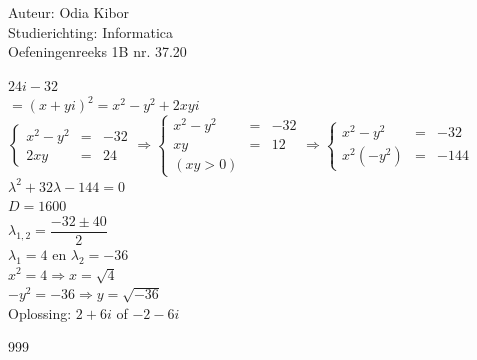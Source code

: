 \documentclass[a4paper]{article}
\begin{document}
  
\noindent \large Auteur: Odia Kibor \\
\noindent \large Studierichting: Informatica\\
\noindent \large Oefeningenreeks 1B nr. 37.20\\

\medskip

\normalsize

$24i-32$\\

$= (x + yi)^2 = x^2 - y^2 + 2xyi $\\

$\left\{
	\begin{array}{lll}
		x^2 - y^2 & = & -32\\
		2xy & = &  24
	\end{array}
\right .
\Rightarrow
\left\{
	\begin{array}{lll}
		x^2 - y^2 & = & -32\\
		xy & = & 12\\
        (xy > 0)
	\end{array}
\right .
\Rightarrow
\left\{
	\begin{array}{lll}
		x^2 - y^2 & = & -32\\
		x^2 (-y^2) & = & -144
	\end{array}
\right .$\\

$\lambda^2 + 32\lambda - 144 = 0$\\

$D = 1600$\\

$\lambda_{1,2} = \dfrac{-32\pm {40}}{2}$\\

$\lambda_1 = 4 $ en $ \lambda_2 = -36$\\

$x^2 = 4 \Rightarrow x = \sqrt{4}$\\

$-y^2 = -36 \Rightarrow y = \sqrt{-36}$\\

Oplossing: $2+6i$ of $-2-6i$





\begin{thebibliography}{999}
\end{thebibliography}
\end{document}
